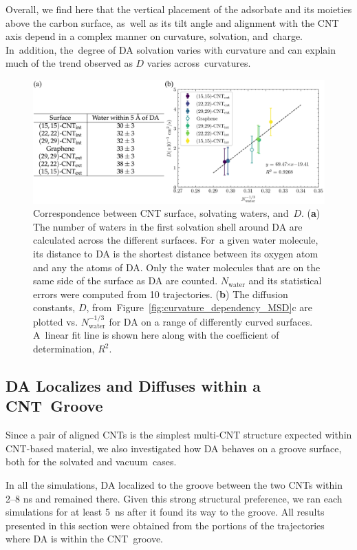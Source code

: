 \documentclass[molecules,article,accept,pdftex,moreauthors]{Definitions/mdpi}
\begin{document}
Overall, we find here that the vertical placement of the adsorbate and its moieties above the carbon surface, as~well as its tilt angle and alignment with the CNT axis depend in a complex manner on curvature, solvation, and~charge. In~addition, the~degree of DA solvation varies with curvature and can explain much of the trend observed as $D$ varies across~curvatures.

\begin{figure}[H]
    \includegraphics[width=\textwidth]{MergedFigs/fig11/output.png}
    \caption{Correspondence between CNT surface, solvating waters, and~$D$. (\textbf{a}) The number of waters in the first solvation shell around DA are calculated across the different surfaces. For~a given water molecule, its distance to DA is the shortest distance between its oxygen atom and any the atoms of DA. Only the water molecules that are on the same side of the surface as DA are counted. $N_\mathrm{water}$ and its statistical errors were computed from 10 trajectories. (\textbf{b}) The diffusion constants, $D$, from~Figure~\ref{fig:curvature_dependency_MSD}c are plotted vs. $N_\mathrm{water}^{-1/3}$ for DA on a range of differently curved surfaces. A~linear fit line is shown here along with the coefficient of determination, $R^2$.}%
    \label{tab:watershell}
\end{figure}

\subsection{DA Localizes and Diffuses within a CNT~Groove}

Since a pair of aligned CNTs is the simplest multi-CNT structure expected within CNT-based material, we also investigated how DA behaves on a groove surface, both for the solvated and vacuum~cases.



In all the simulations, DA localized to the groove between the two CNTs within 2--8 ns and remained there. Given this strong structural preference, we ran each simulations for at least 5~ns after it found its way to the groove. All results presented in this section were obtained from the portions of the trajectories where DA is within the CNT~groove. 
\end{document}
